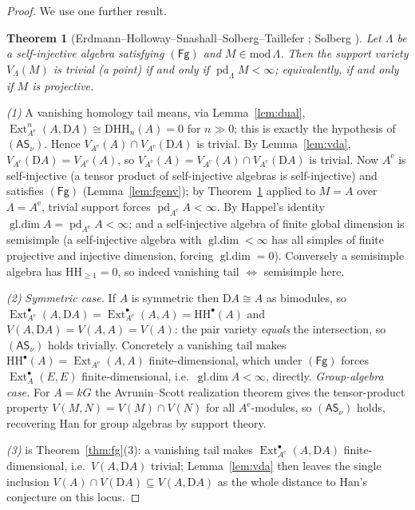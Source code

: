 \documentclass[11pt]{amsart}
\newtheorem{theorem}{Theorem}[section]
\theoremstyle{definition}
\newcommand{\HH}{\mathrm{HH}}
\newcommand{\D}{\mathrm{D}}
\newcommand{\Ext}{\operatorname{Ext}}
\newcommand{\gl}{\operatorname{gl.dim}}
\newcommand{\pd}{\operatorname{pd}}
\newcommand{\Ae}{A^{\mathrm{e}}}
\newcommand{\kk}{k}
\newcommand{\Fg}{\mathsf{(Fg)}}
\newcommand{\ASnu}{\mathsf{(AS_\nu)}}
\begin{document}
\begin{proof}
We use one further result.

\begin{theorem}[{Erdmann--Holloway--Snashall--Solberg--Taillefer
\cite[Thm.~1.5]{EHSST}; Solberg \cite[Thm.~5.9]{SolbergSurvey}}]\label{thm:EHSST}
Let $\Lambda$ be a self-injective algebra satisfying $\Fg$ and
$M\in\mathrm{mod}\,\Lambda$. Then the support variety $V_\Lambda(M)$ is trivial
(a point) if and only if $\pd_\Lambda M<\infty$; equivalently, if and only if
$M$ is projective.
\end{theorem}

\emph{(1)} A vanishing homology tail means, via Lemma~\ref{lem:dual},
$\Ext^n_{\Ae}(A,\D A)\cong\D\HH_n(A)=0$ for $n\gg0$; this is exactly the
hypothesis of $\ASnu$. Hence $V_{\Ae}(A)\cap V_{\Ae}(\D A)$ is trivial. By
Lemma~\ref{lem:vda}, $V_{\Ae}(\D A)=V_{\Ae}(A)$, so
$V_{\Ae}(A)=V_{\Ae}(A)\cap V_{\Ae}(\D A)$ is trivial. Now $\Ae$ is
self-injective (a tensor product of self-injective algebras is self-injective)
and satisfies $\Fg$ (Lemma~\ref{lem:fgenv}); by Theorem~\ref{thm:EHSST} applied to
$M=A$ over $\Lambda=\Ae$, trivial support forces $\pd_{\Ae}A<\infty$. By
Happel's identity $\gl A=\pd_{\Ae}A<\infty$; and a self-injective algebra of
finite global dimension is semisimple (a self-injective algebra with
$\gl<\infty$ has all simples of finite projective and injective dimension,
forcing $\gl=0$). Conversely a semisimple algebra has $\HH_{\ge1}=0$, so
indeed vanishing tail $\iff$ semisimple here.

\emph{(2)} \emph{Symmetric case.} If $A$ is symmetric then $\D A\cong A$ as
bimodules, so $\Ext^\bullet_{\Ae}(A,\D A)=\Ext^\bullet_{\Ae}(A,A)=\HH^\bullet(A)$
and $V(A,\D A)=V(A,A)=V(A)$: the pair variety \emph{equals} the intersection,
so $\ASnu$ holds trivially. Concretely a vanishing tail makes
$\HH^\bullet(A)=\Ext_{\Ae}(A,A)$ finite-dimensional, which under $\Fg$ forces
$\Ext^\bullet_A(E,E)$ finite-dimensional, i.e.\ $\gl A<\infty$, directly.
\emph{Group-algebra case.} For $A=\kk G$ the Avrunin--Scott realization theorem
\cite{AvruninScott} gives the tensor-product property $V(M,N)=V(M)\cap V(N)$
for all $\Ae$-modules, so $\ASnu$ holds, recovering Han for group algebras by
support theory.

\emph{(3)} is Theorem~\ref{thm:fg}(3): a vanishing tail makes
$\Ext^\bullet_{\Ae}(A,\D A)$ finite-dimensional, i.e.\ $V(A,\D A)$ trivial;
Lemma~\ref{lem:vda} then leaves the single inclusion
$V(A)\cap V(\D A)\subseteq V(A,\D A)$ as the whole distance to Han's
conjecture on this locus.
\end{proof}
\end{document}
